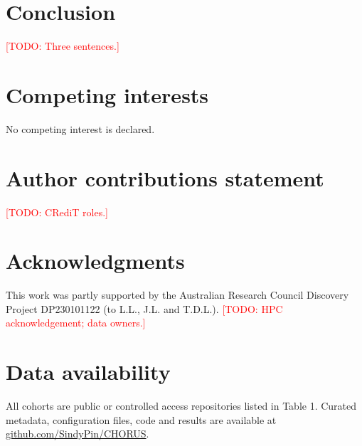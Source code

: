 \documentclass[unnumsec,webpdf,contemporary,large]{oup-authoring-template}
\newcommand{\todo}[1]{\textcolor{red}{[TODO: #1]}}
\begin{document}
\section{Conclusion}

\todo{Three sentences.}

\section{Competing interests}
No competing interest is declared.

\section{Author contributions statement}
\todo{CRediT roles.}

\section{Acknowledgments}
This work was partly supported by the Australian Research Council Discovery Project DP230101122 (to L.L., J.L. and T.D.L.). \todo{HPC acknowledgement; data owners.}

\section{Data availability}
All cohorts are public or controlled access repositories listed in Table 1. Curated metadata, configuration files, code and results are available at \href{https://github.com/SindyPin/CHORUS}{github.com/SindyPin/CHORUS}.



\end{document}
